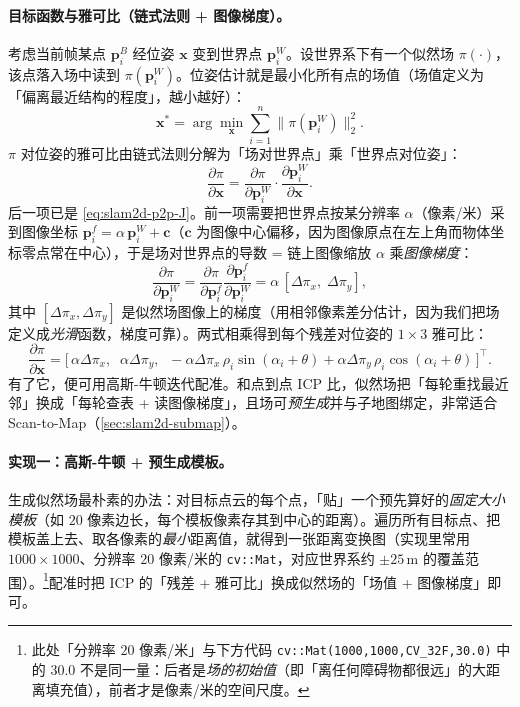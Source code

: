 \paragraph{目标函数与雅可比（链式法则 + 图像梯度）。}
考虑当前帧某点 $\mathbf{p}_i^B$ 经位姿 $\mathbf{x}$ 变到世界点 $\mathbf{p}_i^W$。设世界系下有一个似然场 $\pi(\cdot)$，该点落入场中读到 $\pi(\mathbf{p}_i^W)$。位姿估计就是最小化所有点的场值（场值定义为「偏离最近结构的程度」，越小越好）：
\begin{equation}
\mathbf{x}^*=\arg\min_{\mathbf{x}}\sum_{i=1}^n\big\|\pi(\mathbf{p}_i^W)\big\|_2^2.
\label{eq:slam2d-lf-obj}
\end{equation}
$\pi$ 对位姿的雅可比由链式法则分解为「场对世界点」乘「世界点对位姿」：
\begin{equation}
\frac{\partial\pi}{\partial\mathbf{x}}=\frac{\partial\pi}{\partial\mathbf{p}_i^W}\cdot\frac{\partial\mathbf{p}_i^W}{\partial\mathbf{x}}.
\label{eq:slam2d-lf-chain}
\end{equation}
后一项已是 \cref{eq:slam2d-p2p-J}。前一项需要把世界点按某分辨率 $\alpha$（像素/米）采到图像坐标 $\mathbf{p}_i^f=\alpha\,\mathbf{p}_i^W+\mathbf{c}$（$\mathbf{c}$ 为图像中心偏移，因为图像原点在左上角而物体坐标零点常在中心），于是场对世界点的导数 = 链上图像缩放 $\alpha$ 乘\emph{图像梯度}：
\begin{equation}
\frac{\partial\pi}{\partial\mathbf{p}_i^W}=\frac{\partial\pi}{\partial\mathbf{p}_i^f}\frac{\partial\mathbf{p}_i^f}{\partial\mathbf{p}_i^W}=\alpha\,[\Delta\pi_x,\;\Delta\pi_y],
\label{eq:slam2d-lf-grad}
\end{equation}
其中 $[\Delta\pi_x,\Delta\pi_y]$ 是似然场图像上的梯度（用相邻像素差分估计，因为我们把场定义成\emph{光滑}函数，梯度可靠）。两式相乘得到每个残差对位姿的 $1\times 3$ 雅可比：
\begin{equation}
\frac{\partial\pi}{\partial\mathbf{x}}=\big[\,\alpha\Delta\pi_x,\;\;\alpha\Delta\pi_y,\;\; -\alpha\Delta\pi_x\,\rho_i\sin(\alpha_i+\theta)+\alpha\Delta\pi_y\,\rho_i\cos(\alpha_i+\theta)\,\big]^\top.
\label{eq:slam2d-lf-J}
\end{equation}
有了它，便可用高斯-牛顿迭代配准。和点到点 ICP 比，似然场把「每轮重找最近邻」换成「每轮查表 + 读图像梯度」，且场可\emph{预生成}并与子地图绑定，非常适合 Scan-to-Map（\cref{sec:slam2d-submap}）。

\paragraph{实现一：高斯-牛顿 + 预生成模板。}
生成似然场最朴素的办法：对目标点云的每个点，「贴」一个预先算好的\emph{固定大小模板}（如 $20$ 像素边长，每个模板像素存其到中心的距离）。遍历所有目标点、把模板盖上去、取各像素的\emph{最小}距离值，就得到一张距离变换图（实现里常用 $1000\times 1000$、分辨率 $20$ 像素/米的 \texttt{cv::Mat}，对应世界系约 $\pm 25$\,m 的覆盖范围）。\footnote{此处「分辨率 $20$ 像素/米」与下方代码 \texttt{cv::Mat(1000,1000,CV\_32F,30.0)} 中的 $30.0$ 不是同一量：后者是\emph{场的初始值}（即「离任何障碍物都很远」的大距离填充值），前者才是像素/米的空间尺度。}配准时把 ICP 的「残差 + 雅可比」换成似然场的「场值 + 图像梯度」即可。

